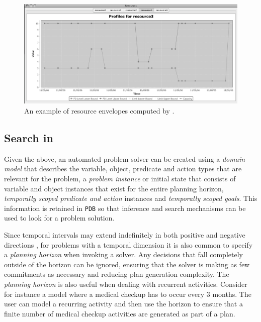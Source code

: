 \begin{figure}
\centering
\includegraphics[scale=2]{figs/europa-resource-envelopes.jpeg}
\caption{\small An example of resource envelopes \cite{Muscettola04,Muscettola06} computed by \eue.}
\label{fig:resenvelopes}
\end{figure}


\subsection{Search in \eu}
\label{sec:europa:search}

Given the above, an automated problem solver can be created using a
\emph{domain model} that describes the variable, object, predicate and
action types that are relevant for the problem, a \emph{problem
  instance} or initial state that consists of variable and object
instances that exist for the entire planning horizon, \emph{temporally
  scoped predicate and action} instances and \emph{temporally scoped
  goals}. This information is retained in \eus \texttt{PDB} so that
inference and search mechanisms can be used to look for a problem
solution.

Since temporal intervals may extend indefinitely in both positive and
negative directions \kcomment{(\eg $[-\infty,+\infty]$)}, for problems
with a temporal dimension it is also common to specify a
\emph{planning horizon} when invoking a solver. Any decisions that
fall completely outside of the horizon can be ignored, ensuring that
the solver is making as few commitments as necessary and reducing plan
generation complexity.  The \emph{planning horizon} is also useful
when dealing with recurrent activities. Consider for instance a model
where a medical checkup has to occur every $3$ months. The user can
model a recurring activity and then use the horizon to ensure that a
finite number of medical checkup activities are generated as part of a
plan.

